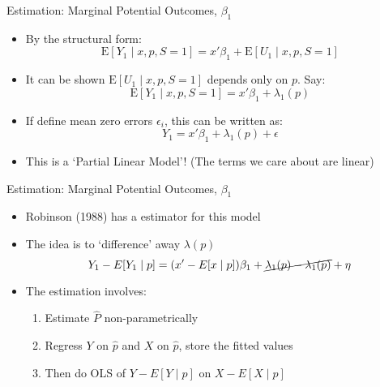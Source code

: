 \documentclass{beamer}
\begin{document}
\begin{frame}{Estimation:  Marginal Potential Outcomes, $\beta_1$}
  \begin{itemize}
\item By the structural form:
\begin{equation*}
  \mathrm{E}[Y_1\mid x, p,S=1] = x'\beta_1 +  \mathrm{E}[U_1\mid x,p,
  S=1   ]
\end{equation*}
\item It can be shown $\mathrm{E}[U_1\mid x,p,
  S=1   ]$ depends only on $p$. Say:
  \begin{equation*}
    \mathrm{E}[Y_1\mid x, p,S=1] = x'\beta_1 +  \lambda_1(p)
  \end{equation*}
\item If define mean zero errors $\epsilon_i$, this can be written as:
 \begin{equation*}
    Y_1 = x'\beta_1 +  \lambda_1(p) + \epsilon
  \end{equation*}
\item This is a `Partial Linear Model'! (The terms we care about are linear)
\end{itemize}
\end{frame}

\begin{frame}{Estimation:  Marginal Potential Outcomes, $\beta_1$}
  \begin{itemize}
  \item Robinson (1988) has a estimator for this model
\item The idea is to
  `difference' away $\lambda(p)$
  \begin{equation*}
Y_1 - E[Y_1\mid p] = (x'-E[x\mid p])\beta_1 +  \cancel{\lambda_1(p) - \lambda_1(p)} + \eta
\end{equation*}
\item The estimation involves:
\begin{enumerate}
\item Estimate $\hat{P}$ non-parametrically
\item Regress $Y$ on $\hat{p}$ and $X$ on $\hat{p}$, store the fitted values
\item Then do OLS of $Y - E[Y\mid p]$ on $X -
   E[X\mid p]$
\end{enumerate}
  \end{itemize}

\end{frame}
\end{document}

